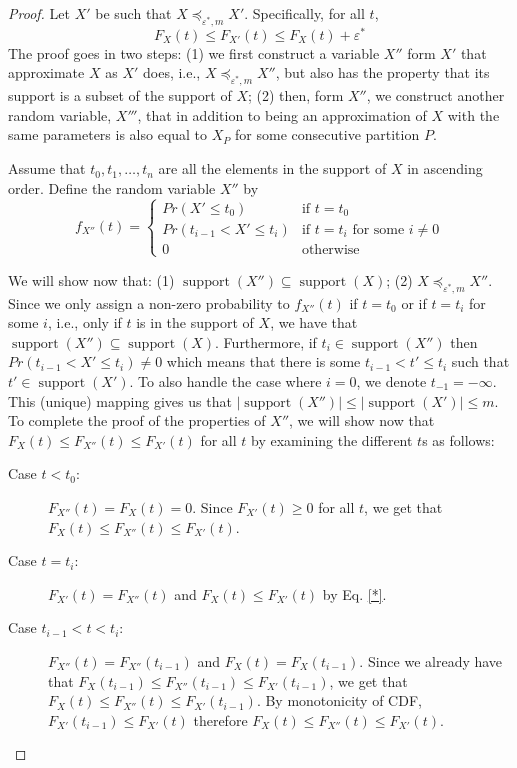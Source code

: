 \documentclass[review]{elsarticle}
\DeclareMathOperator{\support}{support}
\begin{document}
\begin{proof}
Let $X'$ be such that $X \preceq_{\varepsilon^*,m} X'$. Specifically, for all $t$,
\begin{equation}
F_{X}(t) \leq F_{X'}(t) \leq F_X(t)+\varepsilon^*
\label{*}
\end{equation}
The proof goes in two steps: (1) we first construct a variable $X''$ form $X'$ that approximate $X$ as $X'$ does, i.e., $X \preceq_{\varepsilon^*,m} X''$, but also has the property that its support is a subset of the support of $X$; (2) then, form $X''$, we construct another random variable, $X'''$, that in addition to being an approximation of $X$ with the same parameters is also equal to $X_P$ for some consecutive partition $P$. 


Assume that $t_0,t_1,\dots,t_n$ are all the elements in the support of $X$ in ascending order. Define the random variable $X''$ by 
$$
f_{X''}(t) = \begin{cases}
Pr(X' \leq t_0)           & \text{if } t=t_0  \\ 
Pr(t_{i-1} < X' \leq t_i) & \text{if } t=t_i \text{ for some } i \neq 0 \\ 
0                         & \text{otherwise}
\end{cases}
$$

We will show now that: (1) $\support(X'') \subseteq \support(X)$; (2) $X \preceq_{\varepsilon^*,m} X''$.
Since we only assign a non-zero probability to $f_{X''}(t)$ if $t=t_0$ or if $t=t_i$ for some $i$, i.e., only if $t$ is in the support of $X$, we have that $\support(X'') \subseteq \support(X)$. 
Furthermore, if $t_i \in \support(X'')$ then $Pr(t_{i-1} < X' \leq t_i) \neq 0$ which means that there is some $t_{i-1} < t' \leq t_i$ such that $t' \in \support(X')$. To also handle the case where $i=0$, we denote $t_{-1}=-\infty$. This (unique) mapping gives us that $|\support(X'')| \leq |\support(X')| \leq m$. To complete the proof of the properties of $X''$, we will show now that $F_{X}(t) \leq  F_{X''}(t) \leq F_{X'}(t)$ for all $t$ by examining the different $t$s as follows: 
\begin{description}
\item[Case $t < t_0$:] $F_{X''}(t)=F_{X}(t)=0$. Since $F_{X'}(t) \geq 0$ for all $t$, we get that $F_{X}(t) \leq  F_{X''}(t) \leq F_{X'}(t)$.
\item[Case $t=t_i$:] $F_{X'}(t)=F_{X''}(t)$ and $F_{X}(t) \leq F_{X'}(t)$ by Eq. \eqref{*}.
\item[Case $t_{i-1} < t < t_i$:] $F_{X''}(t)= F_{X''}(t_{i-1})$ and $F_{X}(t)=F_{X}(t_{i-1})$. Since we already have that $F_{X}(t_{i-1}) \leq F_{X''}(t_{i-1}) \leq F_{X'}(t_{i-1})$, we get that $F_{X}(t) \leq F_{X''}(t) \leq F_{X'}(t_{i-1})$. By monotonicity of CDF, $F_{X'}(t_{i-1}) \leq F_{X'}(t)$ therefore $F_{X}(t) \leq F_{X''}(t) \leq F_{X'}(t)$.


\end{description}
\end{proof}
\end{document}

